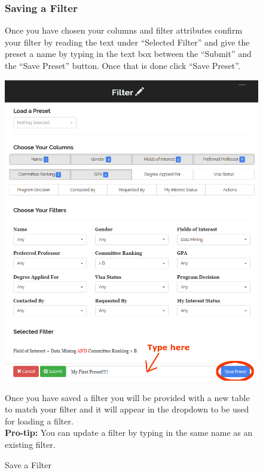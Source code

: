 \documentclass[fontsize=12pt,paper=letter,twoside]{scrartcl}
\begin{document}
\begin{figure}[!htb]
\subsubsection{Saving a Filter}
Once you have chosen your columns and filter attributes confirm your filter by reading the text under ``Selected Filter'' and give the preset a name by typing in the text box between the ``Submit'' and the ``Save Preset'' button. Once that is done click ``Save Preset''.
\begin{center}
\includegraphics[width=.99\textwidth]{images/save_filter.png}
\end{center}
\caption{Save a Filter}
Once you have saved a filter you will be provided with a new table to match your filter and it will appear in the dropdown to be used for loading a filter.\\
\textbf{Pro-tip:} You can update a filter by typing in the same name as an existing filter.
\label{fig:save_filter}
\end{figure}
\end{document}
